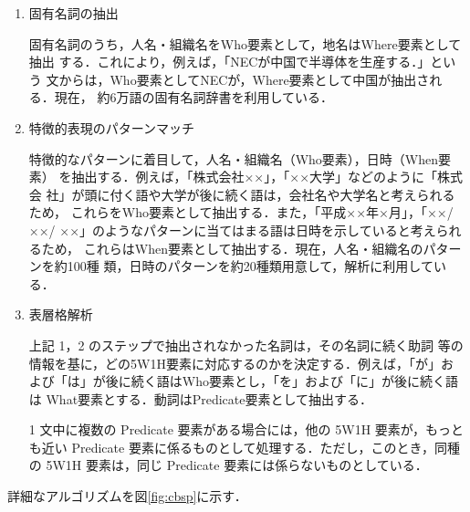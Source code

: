\begin{enumerate}
\setlength{\itemindent}{8pt}
\item 固有名詞の抽出

固有名詞のうち，人名・組織名をWho要素として，地名はWhere要素として抽出
する．これにより，例えば，「NECが中国で半導体を生産する．」という
文からは，Who要素としてNECが，Where要素として中国が抽出される．現在，
約6万語の固有名詞辞書を利用している．

\item 特徴的表現のパターンマッチ

特徴的なパターンに着目して，人名・組織名（Who要素），日時（When要素）
を抽出する．例えば，「株式会社××」，「××大学」などのように「株式会
社」が頭に付く語や大学が後に続く語は，会社名や大学名と考えられるため，
これらをWho要素として抽出する．また，「平成××年×月」，「××/××/
××」のようなパターンに当てはまる語は日時を示していると考えられるため，
これらはWhen要素として抽出する．現在，人名・組織名のパターンを約100種
類，日時のパターンを約20種類用意して，解析に利用している．

\item 表層格解析

上記 1，2 のステップで抽出されなかった名詞は，その名詞に続く助詞
等の情報を基に，どの5W1H要素に対応するのかを決定する．例えば，「が」お
よび「は」が後に続く語はWho要素とし，「を」および「に」が後に続く語は
What要素とする．動詞はPredicate要素として抽出する．

1 文中に複数の Predicate 要素がある場合には，他の 5W1H 要素が，もっと
も近い Predicate 要素に係るものとして処理する．ただし，このとき，同種
の 5W1H 要素は，同じ Predicate 要素には係らないものとしている．

\end{enumerate}

詳細なアルゴリズムを図\ref{fig:cbsp}に示す．

